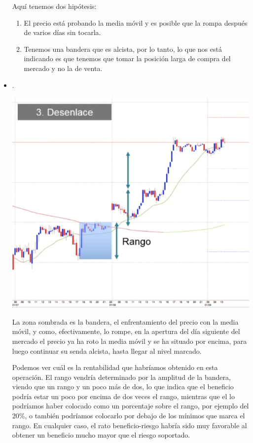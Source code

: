 \begin{itemize}
    Aquí tenemos dos hipótesis:
    \begin{enumerate}
        \item El precio está probando la media móvil y es posible que la rompa después de varios días sin tocarla.
        \item Tenemos una bandera que es alcista, por lo tanto, lo que nos está indicando es que tenemos que tomar la posición larga de compra del mercado y no la de venta.
    \end{enumerate}
    \item {}. 
    \begin{center}
        \includegraphics[scale=.65]{images/mod03-23.png}
    \end{center} 
    La zona sombrada es la bandera, el enfrentamiento del precio con la media móvil, y como, efectivamente, lo rompe, en la apertura del día siguiente del mercado el precio ya ha roto la media móvil y se ha situado por encima, para luego continuar su senda alcista, hasta llegar al nivel marcado. 

    Podemos ver cuál es la rentabilidad que habríamos obtenido en esta operación. El rango vendría determinado por la amplitud de la bandera, viendo que un rango y un poco más de dos, lo que indica que el beneficio podría estar un poco por encima de dos veces el rango, mientras que el  lo podríamos haber colocado como un porcentaje sobre el rango, por ejemplo del 20\%, o también podríamos colocarlo por debajo de los mínimos que marca el rango. En cualquier caso, el rato beneficio-riesgo habría sido muy favorable al obtener un beneficio mucho mayor que el riesgo soportado.
\end{itemize}

